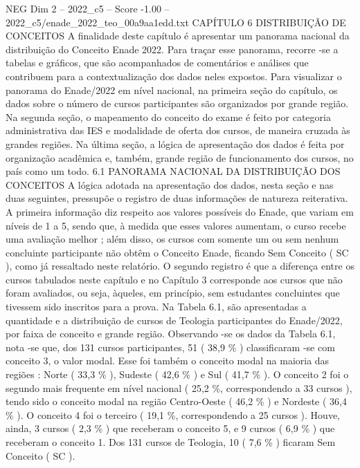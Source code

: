 \begin{textsample}{NEG Dim 2 – 2022\_c5 – Score -1.00 – 2022\_c5/enade\_2022\_teo\_00a9aa1edd.txt}  \label{ex:f2_neg_215}
CAPÍTULO 6 DISTRIBUIÇÃO DE CONCEITOS A finalidade deste capítulo é apresentar um panorama nacional da distribuição do Conceito Enade 2022.
Para traçar esse panorama, recorre -se a tabelas e gráficos, que são acompanhados de comentários e análises que contribuem para a contextualização dos dados neles expostos.
Para visualizar o panorama do Enade/2022 em nível nacional, na primeira seção do capítulo, os dados sobre o número de cursos participantes são organizados por grande região.
Na segunda seção, o mapeamento do conceito do exame é feito por categoria administrativa das IES e modalidade de oferta dos cursos, de maneira cruzada às grandes regiões.
Na última seção, a lógica de apresentação dos dados é feita por organização acadêmica e, também, grande região de funcionamento dos cursos, no país como um todo. 6.1 PANORAMA NACIONAL DA DISTRIBUIÇÃO DOS CONCEITOS A lógica adotada na apresentação dos dados, nesta seção e nas duas seguintes, pressupõe o registro de duas informações de natureza reiterativa.
A primeira informação diz respeito aos valores possíveis do Enade, que variam em níveis de 1 a 5, sendo que, à medida que esses valores aumentam, o curso recebe uma avaliação melhor ; além disso, os cursos com somente um ou sem nenhum concluinte participante não obtêm o Conceito Enade, ficando Sem Conceito ( SC ), como já ressaltado neste relatório.
O segundo registro é que a diferença entre os cursos tabulados neste capítulo e no Capítulo 3 corresponde aos cursos que não foram avaliados, ou seja, àqueles, em princípio, sem estudantes concluintes que tivessem sido inscritos para a prova.
Na Tabela 6.1, são apresentadas a quantidade e a distribuição de cursos de Teologia participantes do Enade/2022, por faixa de conceito e grande região.
Observando -se os dados da Tabela 6.1, nota -se que, dos 131 cursos participantes, 51 ( 38,9 \% ) classificaram -se com conceito 3, o valor modal.
Esse foi também o conceito modal na maioria das regiões : Norte ( 33,3 \% ), Sudeste ( 42,6 \% ) e Sul ( 41,7 \% ).
O conceito 2 foi o segundo mais frequente em nível nacional ( 25,2 \%, correspondendo a 33 cursos ), tendo sido o conceito modal na região Centro-Oeste ( 46,2 \% ) e Nordeste ( 36,4 \% ).
O conceito 4 foi o terceiro ( 19,1 \%, correspondendo a 25 cursos ).
Houve, ainda, 3 cursos ( 2,3 \% ) que receberam o conceito 5, e 9 cursos ( 6,9 \% ) que receberam o conceito 1.
Dos 131 cursos de Teologia, 10 ( 7,6 \% ) ficaram Sem Conceito ( SC ).

\end{textsample}
